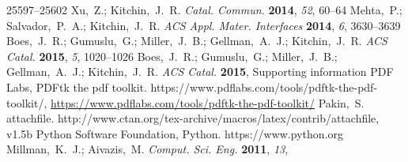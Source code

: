 \documentclass[journal=accacs,manuscript=article,email=true]{achemso}
\begin{document}
\begin{mcitethebibliography}{35}
  25597--25602\relax
\mciteBstWouldAddEndPuncttrue
\mciteSetBstMidEndSepPunct{\mcitedefaultmidpunct}
{\mcitedefaultendpunct}{\mcitedefaultseppunct}\relax
\EndOfBibitem
{}
Xu,~Z.; Kitchin,~J.~R. \emph{Catal. Commun.} \textbf{2014}, \emph{52},
  60--64\relax
\mciteBstWouldAddEndPuncttrue
\mciteSetBstMidEndSepPunct{\mcitedefaultmidpunct}
{\mcitedefaultendpunct}{\mcitedefaultseppunct}\relax
\EndOfBibitem
{}
Mehta,~P.; Salvador,~P.~A.; Kitchin,~J.~R. \emph{ACS Appl. Mater. Interfaces}
  \textbf{2014}, \emph{6}, 3630--3639\relax
\mciteBstWouldAddEndPuncttrue
\mciteSetBstMidEndSepPunct{\mcitedefaultmidpunct}
{\mcitedefaultendpunct}{\mcitedefaultseppunct}\relax
\EndOfBibitem
{}
Boes,~J.~R.; Gumuslu,~G.; Miller,~J.~B.; Gellman,~A.~J.; Kitchin,~J.~R.
  \emph{ACS Catal.} \textbf{2015}, \emph{5}, 1020--1026\relax
\mciteBstWouldAddEndPuncttrue
\mciteSetBstMidEndSepPunct{\mcitedefaultmidpunct}
{\mcitedefaultendpunct}{\mcitedefaultseppunct}\relax
\EndOfBibitem
{}
Boes,~J.~R.; Gumuslu,~G.; Miller,~J.~B.; Gellman,~A.~J.; Kitchin,~J.~R.
  \emph{ACS Catal.} \textbf{2015}, Supporting information\relax
\mciteBstWouldAddEndPuncttrue
\mciteSetBstMidEndSepPunct{\mcitedefaultmidpunct}
{\mcitedefaultendpunct}{\mcitedefaultseppunct}\relax
\EndOfBibitem
{}
{PDF Labs}, {PDFtk} the pdf toolkit.
  https://www.pdflabs.com/tools/pdftk-the-pdf-toolkit/,
  \url{https://www.pdflabs.com/tools/pdftk-the-pdf-toolkit/}\relax
\mciteBstWouldAddEndPuncttrue
\mciteSetBstMidEndSepPunct{\mcitedefaultmidpunct}
{\mcitedefaultendpunct}{\mcitedefaultseppunct}\relax
\EndOfBibitem
{}
Pakin,~S. attachfile.
  http://www.ctan.org/tex-archive/macros/latex/contrib/attachfile, v1.5b\relax
\mciteBstWouldAddEndPuncttrue
\mciteSetBstMidEndSepPunct{\mcitedefaultmidpunct}
{\mcitedefaultendpunct}{\mcitedefaultseppunct}\relax
\EndOfBibitem
{}
{Python Software Foundation}, Python. https://www.python.org\relax
\mciteBstWouldAddEndPuncttrue
\mciteSetBstMidEndSepPunct{\mcitedefaultmidpunct}
{\mcitedefaultendpunct}{\mcitedefaultseppunct}\relax
\EndOfBibitem
{}
Millman,~K.~J.; Aivazis,~M. \emph{Comput. Sci. Eng.} \textbf{2011}, \emph{13},

\end{mcitethebibliography}
\end{document}
